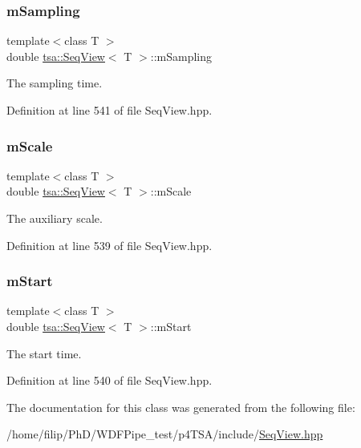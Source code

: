 \subsubsection{\texorpdfstring{m\+Sampling}{mSampling}}
{\footnotesize\ttfamily template$<$class T $>$ \\
double \hyperlink{classtsa_1_1_seq_view}{tsa\+::\+Seq\+View}$<$ T $>$\+::m\+Sampling\hspace{0.3cm}{\ttfamily [protected]}}



The sampling time. 



Definition at line 541 of file Seq\+View.\+hpp.

\mbox{\label{classtsa_1_1_seq_view_ac581e81bc585bf0b3587b728c51b5cd5}} 
\subsubsection{\texorpdfstring{m\+Scale}{mScale}}
{\footnotesize\ttfamily template$<$class T $>$ \\
double \hyperlink{classtsa_1_1_seq_view}{tsa\+::\+Seq\+View}$<$ T $>$\+::m\+Scale\hspace{0.3cm}{\ttfamily [protected]}}



The auxiliary scale. 



Definition at line 539 of file Seq\+View.\+hpp.

\mbox{\label{classtsa_1_1_seq_view_a08dbe816c3c5acbf43fbce7205a9dccb}} 
\subsubsection{\texorpdfstring{m\+Start}{mStart}}
{\footnotesize\ttfamily template$<$class T $>$ \\
double \hyperlink{classtsa_1_1_seq_view}{tsa\+::\+Seq\+View}$<$ T $>$\+::m\+Start\hspace{0.3cm}{\ttfamily [protected]}}



The start time. 



Definition at line 540 of file Seq\+View.\+hpp.



The documentation for this class was generated from the following file\+:\begin{DoxyCompactItemize}
\item 
/home/filip/\+Ph\+D/\+W\+D\+F\+Pipe\+\_\+test/p4\+T\+S\+A/include/\hyperlink{_seq_view_8hpp}{Seq\+View.\+hpp}\end{DoxyCompactItemize}
